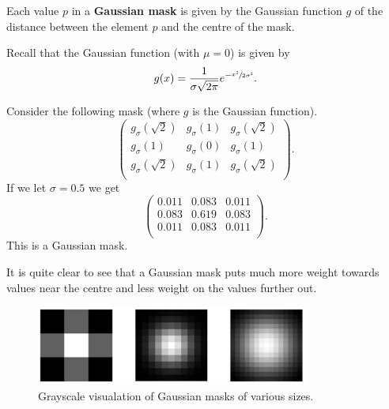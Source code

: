 \begin{definition}
    Each value $p$ in a \textbf{Gaussian mask} is given by the Gaussian function $g$ of the distance between the element $p$ and the centre of the mask.
\end{definition}

\begin{remark}
    Recall that the Gaussian function (with $\mu = 0$) is given by
    \[ g(x) = \frac{1}{\sigma\sqrt{2\pi}} e^{-\sfrac{x^2}{2\sigma^2}}. \]
\end{remark}

\begin{example}[Gaussian mask, $n = 3$]
    Consider the following mask (where $g$ is the Gaussian function).
    \[
        \begin{pmatrix}
            g_\sigma(\sqrt 2) & g_\sigma(1) & g_\sigma(\sqrt 2) \\
            g_\sigma(1) & g_\sigma(0) & g_\sigma(1) \\
            g_\sigma(\sqrt 2) & g_\sigma(1) & g_\sigma(\sqrt 2) \\
        \end{pmatrix}
        .
    \]
    If we let $\sigma = 0.5$ we get
    \[
        \begin{pmatrix}
            0.011 & 0.083 & 0.011 \\
            0.083 & 0.619 & 0.083 \\
            0.011 & 0.083 & 0.011 \\
        \end{pmatrix}
        .
    \]
    This is a Gaussian mask.
\end{example}

\begin{remark}
    It is quite clear to see that a Gaussian mask puts much more weight towards values near the centre and less weight on the values further out.
\end{remark}

\begin{figure}
    \centering
    \includegraphics[width = 0.8\textwidth]{images/gaussian-mask.png}
    \caption{Grayscale visualation of Gaussian masks of various sizes.}
    \label{fig:gaussian-mask}
\end{figure}

